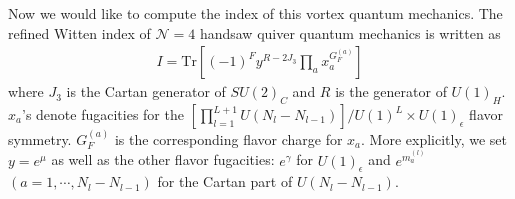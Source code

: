 \documentclass[a4paper,11pt]{article}
\begin{document}
Now we would like to compute the index of this vortex quantum mechanics. The refined Witten index of $\mathcal N = 4$ handsaw quiver quantum mechanics is written as \cite{Hori:2014tda}
\begin{align}
I= \mathrm{Tr} \left[ (-1)^F y^{R-2 J_3} \prod_a x^{G^{(a)}_F}_a \right]
\end{align}
where $J_3$ is the Cartan generator of  $SU(2)_C$ and $R$ is the generator of $U(1)_H$.
$x_a$'s denote fugacities for the $[\prod_{l=1}^{L+1} U(N_{l}-N_{l-1})]/U(1)^L \times U(1)_{\epsilon}$ flavor symmetry.
$G^{(a)}_{F}$ is the corresponding flavor charge for $x_a$.
More explicitly, we set $y=e^{\mu}$ as well as the other flavor fugacities: $e^{\gamma}$ for $U(1)_{\epsilon}$ and $e^{m^{(l)}_a}$  $(a=1, \cdots, N_{l}-N_{l-1})$ for the Cartan part of $U(N_l-N_{l-1})$.
\end{document}
